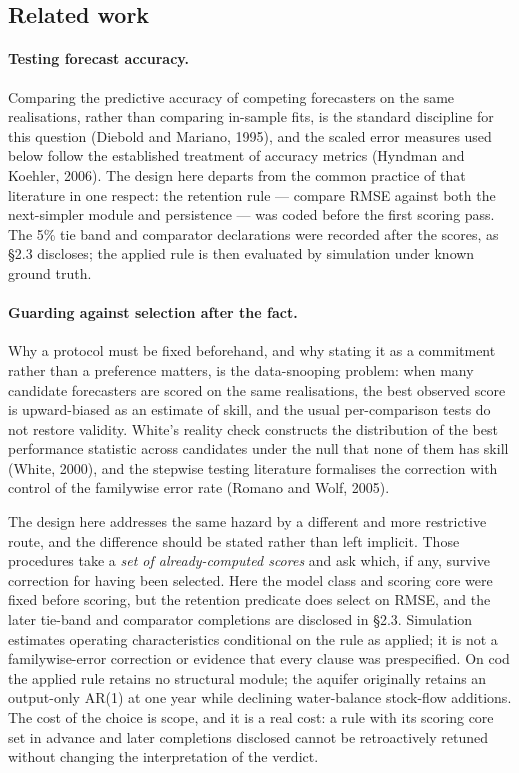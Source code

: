 \documentclass[11pt]{article}
\begin{document}
\subsection{Related work}
\label{cod-priorart}

\paragraph{Testing forecast accuracy.} Comparing the predictive accuracy of competing
forecasters on the same realisations, rather than comparing in-sample fits, is the standard
discipline for this question (Diebold and Mariano, 1995), and the scaled error measures used
below follow the established treatment of accuracy metrics (Hyndman and Koehler, 2006). The
design here departs from the common practice of that literature in one respect: the retention
rule --- compare RMSE against both the next-simpler module and
persistence --- was coded before the first scoring pass. The 5\% tie band
and comparator declarations were recorded after the scores, as \S2.3 discloses;
the applied rule is then evaluated by simulation under known ground truth.

\paragraph{Guarding against selection after the fact.} Why a protocol must be fixed beforehand,
and why stating it as a commitment rather than a preference matters, is the data-snooping
problem: when many candidate forecasters are scored on the same realisations, the best observed
score is upward-biased as an estimate of skill, and the usual per-comparison tests do not
restore validity. White's reality check constructs the distribution of the best performance
statistic across candidates under the null that none of them has skill (White, 2000), and the
stepwise testing literature formalises the correction with control of the familywise error rate
(Romano and Wolf, 2005).

The design here addresses the same hazard by a different and more restrictive route, and the
difference should be stated rather than left implicit. Those procedures take a \emph{set of
already-computed scores} and ask which, if any, survive correction for having been selected.
Here the model class and scoring core were fixed before scoring, but the
retention predicate does select on RMSE, and the later tie-band and comparator
completions are disclosed in \S2.3. Simulation estimates operating
characteristics conditional on the rule as applied; it is not a
familywise-error correction or evidence that every clause was prespecified.
On cod the applied rule retains no structural module; the aquifer
originally retains an output-only AR(1) at one year while declining
water-balance stock-flow additions. The cost of the choice is scope, and it is a real cost: a rule
with its scoring core set in advance and later completions disclosed cannot
be retroactively retuned without changing the interpretation of the verdict.
\end{document}
